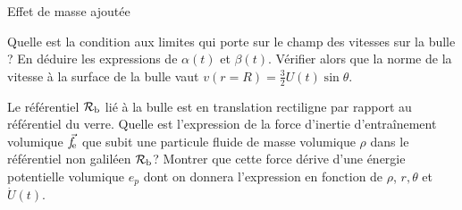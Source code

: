 \begin{exo}[PC][2][devoir]{Effet de masse ajoutée}
\begin{quest}
\item Quelle est la condition aux limites qui porte sur le champ des vitesses sur la bulle ? En déduire les expressions de $\alpha(t)$ et $\beta(t)$. Vérifier alors que
la norme de la vitesse à la surface de la bulle vaut $v(r=R)=\textstyle\frac{3}{2}U(t)\sin \theta$.



\item Le référentiel $\mathcal{R}_{\rm{b}}$ lié à la bulle  est en translation rectiligne par rapport au référentiel du verre. Quelle est l'expression de la force d'inertie d’entraînement volumique $\Vec{f}_{\rm \! e}$ que subit une particule fluide de masse volumique $\rho$ dans le référentiel non galiléen $\mathcal{R}_{\rm{b}}$?  Montrer que cette force dérive d'une énergie potentielle volumique $e_p$ dont on donnera l'expression en fonction de $\rho$, $r,\theta$ et $\dot{U}(t)$.





\end{quest}
\end{exo}
